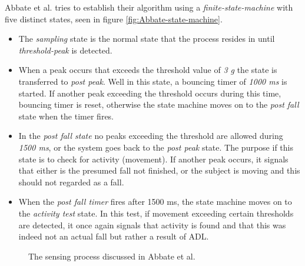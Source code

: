 \documentclass[12pt, a4paper, onecolumn]{article}
\begin{document}
	Abbate et al. tries to establish their algorithm using a \textit{finite-state-machine} with five distinct states, seen in figure \ref{fig:Abbate-state-machine}.
	
	\begin{itemize}
		\item The \textit{sampling} state is the normal state that the process resides in until \textit{threshold-peak} is detected.
		
		\item When a peak occurs that exceeds the threshold value of \textit{3 g} the state is transferred to \textit{post peak}. Well in this state, a bouncing timer of \textit{1000 ms} is started. If another peak exceeding the threshold occurs during this time, bouncing timer is reset, otherwise the state machine moves on to the \textit{post fall} state when the timer fires.
		
		\item In the \textit{post fall state} no peaks exceeding the threshold are allowed during \textit{1500 ms}, or the system goes back to the \textit{post peak} state. The purpose if this state is to check for activity (movement). If another peak occurs, it signals that either is the presumed fall not finished, or the subject is moving and this should not regarded as a fall. 
		
		\item When the \textit{post fall timer} fires after 1500 ms, the state machine moves on to the \textit{activity test} state. In this test, if movement exceeding certain thresholds are detected, it once again signals that activity is found and that this was indeed not an actual fall but rather a result of ADL. 
		
	\end{itemize}  
	
	
	\begin{figure}[H]
		\centering
		\caption{The sensing process discussed in Abbate et al.}%
		\label{fig:abbatea-state-machine}%
	\end{figure}
	
\end{document}
